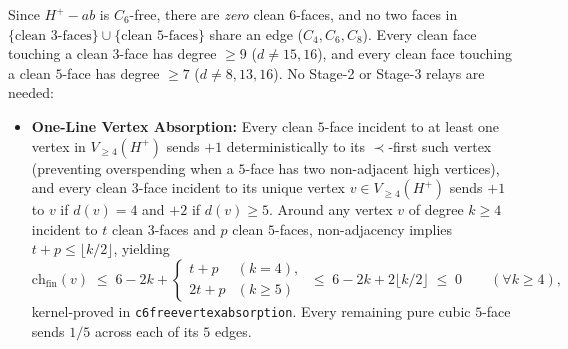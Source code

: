 \documentclass[11pt,reqno]{amsart}
\theoremstyle{plain}
\theoremstyle{definition}
\theoremstyle{remark}
\newcommand{\chf}{\mathrm{ch}_{\mathrm{fin}}}
\newcommand{\Vge}{V_{\ge 4}}
\DeclareRobustCommand{\_}{\ifmmode\text{\textunderscore}\else\textunderscore\allowbreak\fi}
\begin{document}
Since $H^+ - ab$ is $C_6$-free, there are \emph{zero} clean $6$-faces, and no two faces in $\{\text{clean } 3\text{-faces}\} \cup \{\text{clean } 5\text{-faces}\}$ share an edge ($C_4, C_6, C_8$). Every clean face touching a clean $3$-face has degree $\ge 9$ ($d \neq 15, 16$), and every clean face touching a clean $5$-face has degree $\ge 7$ ($d \neq 8, 13, 16$). No Stage-2 or Stage-3 relays are needed:
\begin{itemize}[leftmargin=1.8em]
  \item \textbf{One-Line Vertex Absorption:} Every clean $5$-face incident to at least one vertex in $\Vge(H^+)$ sends $+1$ deterministically to its $\prec$-first such vertex (preventing overspending when a $5$-face has two non-adjacent high vertices), and every clean $3$-face incident to its unique vertex $v \in \Vge(H^+)$ sends $+1$ to $v$ if $d(v) = 4$ and $+2$ if $d(v) \ge 5$. Around any vertex $v$ of degree $k \ge 4$ incident to $t$ clean $3$-faces and $p$ clean $5$-faces, non-adjacency implies $t + p \le \lfloor k/2 \rfloor$, yielding
  \[
    \chf(v) \;\le\; 6 - 2k + \begin{cases} t + p & (k = 4), \\ 2t + p & (k \ge 5) \end{cases} \;\le\; 6 - 2k + 2\lfloor k/2 \rfloor \;\le\; 0 \qquad (\forall k \ge 4),
  \]
  kernel-proved in \texttt{c6free\_vertex\_absorption}. Every remaining pure cubic $5$-face sends $1/5$ across each of its $5$ edges.


\end{itemize}
\end{document}
